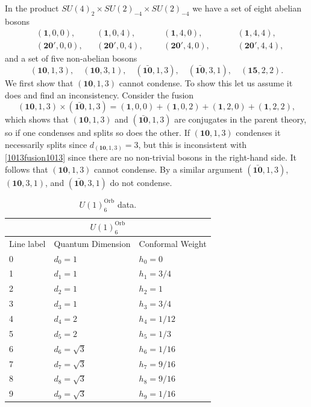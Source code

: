 \documentclass[11pt]{article}
\numberwithin{equation}{section}
\begin{document}
In the product $SU(4)_{2} \times SU(2)_{-4} \times SU(2)_{-4}$ we have a set of eight abelian bosons
\begin{align}
    &(\mathbf{1},0,0), &&(\mathbf{1},0,4), &&&(\mathbf{1},4,0), &&&&(\mathbf{1},4,4), \nonumber \\[0.3cm]
    &(\mathbf{20}',0,0), &&(\mathbf{20}',0,4), &&&(\mathbf{20}',4,0), &&&&(\mathbf{20}',4,4), \nonumber
\end{align}
and a set of five non-abelian bosons
\begin{equation}
    (\mathbf{10},1,3), \quad (\mathbf{10},3,1), \quad (\mathbf{\bar{10}},1,3), \quad (\mathbf{\bar{10}},3,1), \quad (\mathbf{15},2,2).
\end{equation}
We first show that $(\mathbf{10},1,3)$ cannot condense. To show this let us assume it does and find an inconsistency. Consider the fusion
\begin{equation}
    (\mathbf{10},1,3) \times (\mathbf{\bar{10}},1,3) = (\mathbf{1},0,0) + (\mathbf{1},0,2) + (\mathbf{1},2,0) + (\mathbf{1},2,2), \label{1013fusion1013}
\end{equation}
which shows that $(\mathbf{10},1,3)$ and $(\mathbf{\bar{10}},1,3)$ are conjugates in the parent theory, so if one condenses and splits so does the other. If $(\mathbf{10},1,3)$ condenses it necessarily splits since $d_{(\mathbf{10},1,3)} = 3$, but this is inconsistent with \eqref{1013fusion1013} since there are no non-trivial bosons in the right-hand side. It follows that $(\mathbf{10},1,3)$ cannot condense. By a similar argument $(\mathbf{\bar{10}},1,3)$, $(\mathbf{10},3,1)$, and $(\mathbf{\bar{10}},3,1)$ do not condense.

\begin{table}[t]
\centering
\begin{tabular}[h]{|p{4cm}|p{4cm}|p{4cm}| }
\hline 
\multicolumn{3}{|c|}{$U(1)^{\mathrm{Orb}}_{6}$} \\
\hline
Line label & Quantum Dimension & Conformal Weight \\
\hline
0 & $d_{0}=1$ & $h_{0}=0$ \\
1 & $d_{1}=1$ & $h_{1}=3/4$ \\
2 & $d_{2}=1$ & $h_{2}=1$ \\
3 & $d_{3}=1$ & $h_{3}=3/4$ \\
4 & $d_{4}=2 $ & $h_{4}=1/12$ \\
5 & $d_{5}=2$ & $h_{5}=1/3$ \\
6 & $d_{6}=\sqrt{3}$ & $h_{6}=1/16$ \\
7 & $d_{7}=\sqrt{3}$ & $h_{7}=9/16$ \\
8 & $d_{8}=\sqrt{3}$ & $h_{8}=9/16$ \\
9 & $d_{9}=\sqrt{3}$ & $h_{9}=1/16$ \\
\hline
\end{tabular}
\caption{$U(1)^{\mathrm{Orb}}_{6}$ data.}  \label{Orb6table}
\end{table}
\end{document}
